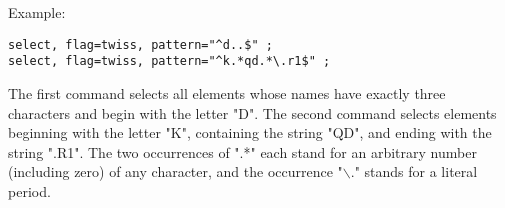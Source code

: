 Example: 
\begin{verbatim}
select, flag=twiss, pattern="^d..$" ;
select, flag=twiss, pattern="^k.*qd.*\.r1$" ;
\end{verbatim}
 
The first command selects all elements whose names have exactly three
characters and begin with the letter "D". The second command selects
elements beginning with the letter "K", containing the string "QD", and
ending with the string ".R1". The two occurrences of ".*" each stand for
an arbitrary number (including zero) of any character, and the
occurrence "$\backslash$." stands for a literal period.  


